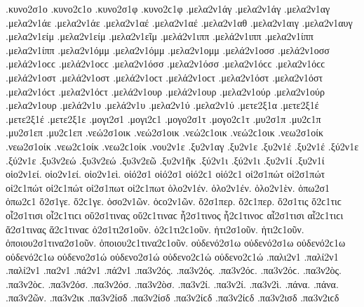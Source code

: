 {.κυνο2σ1ο .κυνο2ϲ1ο
.κυνο2σ1φ .κυνο2ϲ1φ   %
.μελα2ν1άγ .μελα2ν1άγ   %
.μελα2ν1αγ
.μελα2ν1άε .μελα2ν1άε   %
.μελα2ν1αέ .μελα2ν1αέ
.μελα2ν1αθ   %
.μελα2ν1αιγ   %
.μελα2ν1αυγ   %
.μελα2ν1είμ .μελα2ν1είμ   %
.μελα2ν1εῖμ   %
.μελά2ν1ιππ .μελά2ν1ιππ   %
.μελα2ν1ίππ .μελα2ν1ίππ
.μελα2ν1όμμ .μελα2ν1όμμ   %
.μελα2ν1ομμ
.μελά2ν1οσσ .μελά2ν1οσσ .μελά2ν1οϲϲ .μελά2ν1οϲϲ   %
.μελα2ν1όσσ .μελα2ν1όσσ .μελα2ν1όϲϲ .μελα2ν1όϲϲ
.μελά2ν1οστ .μελά2ν1οστ .μελά2ν1οϲτ .μελά2ν1οϲτ   %
.μελα2ν1όστ .μελα2ν1όστ .μελα2ν1όϲτ .μελα2ν1όϲτ
.μελά2ν1ουρ .μελά2ν1ουρ   %
.μελα2ν1ούρ .μελα2ν1ούρ
.μελα2ν1ουρ   %
.μελά2ν1υ .μελά2ν1υ   %
.μελα2ν1ύ .μελα2ν1ύ
.μετε2ξ1α   %
.μετε2ξ1έ .μετε2ξ1έ   %
.μετε2ξ1ε
.μογι2σ1 .μογι2ϲ1   %
.μογο2σ1τ .μογο2ϲ1τ   %
.μυ2σ1π .μυ2ϲ1π   %
.μυ2σ1επ .μυ2ϲ1επ   %
.νεώ2σ1οικ .νεώ2σ1οικ .νεώ2ϲ1οικ .νεώ2ϲ1οικ   %
.νεω2σ1οίκ .νεω2σ1οίκ .νεω2ϲ1οίκ .νεω2ϲ1οίκ
.νου2ν1ε   %
.ξυ2ν1αγ   %
.ξυ2ν1ε
.ξυ2ν1έ .ξυ2ν1έ
.ξύ2ν1ε .ξύ2ν1ε
.ξυ3ν2εώ .ξυ3ν2εώ   %
.ξυ3ν2εῶ
.ξυ2ν1ῆκ   %
.ξύ2ν1ι .ξύ2ν1ι   %
.ξυ2ν1ί .ξυ2ν1ί   %
οἱο2ν1εί. οἱο2ν1εί.   %
οἱο2ν1εὶ.
οἱό2σ1 οἱό2σ1 οἱό2ϲ1 οἱό2ϲ1   %
οἰ2σ1πώτ οἰ2σ1πώτ οἰ2ϲ1πώτ οἰ2ϲ1πώτ   %
οἰ2σ1πωτ οἰ2ϲ1πωτ
ὁλο2ν1έν. ὁλο2ν1έν.
ὁλο2ν1ὲν.
ὁπω2σ1 ὁπω2ϲ1   %
ὅ2σ1γε. ὅ2ϲ1γε.   %
ὁσο2ν1ῶν. ὁϲο2ν1ῶν.   %
ὅ2σ1περ. ὅ2ϲ1περ.   %
ὅ2σ1τις ὅ2ϲ1τιϲ   %
οἷ2σ1τισι οἷ2ϲ1τιϲι   %
οὕ2σ1τινας οὕ2ϲ1τιναϲ   %
ἧ2σ1τινος ἧ2ϲ1τινοϲ   %
αἷ2σ1τισι αἷ2ϲ1τιϲι   %
ἅ2σ1τινας ἅ2ϲ1τιναϲ   %
ὁ2σ1τι2σ1οῦν. ὁ2ϲ1τι2ϲ1οῦν.   %
ἡτι2σ1οῦν. ἡτι2ϲ1οῦν.   %
ὁποιου2σ1τινα2σ1οῦν. ὁποιου2ϲ1τινα2ϲ1οῦν.   %
οὐδενό2σ1ω οὐδενό2σ1ω οὐδενό2ϲ1ω οὐδενό2ϲ1ω   %
οὐδενο2σ1ώ οὐδενο2σ1ώ οὐδενο2ϲ1ώ οὐδενο2ϲ1ώ
.παλι2ν1   %
.παλί2ν1 .παλί2ν1   %
.πα2ν1
.πά2ν1 .πά2ν1
.πα3ν2ός. .πα3ν2ός. .πα3ν2όϲ. .πα3ν2όϲ.   %
.πα3ν2ὸς. .πα3ν2ὸϲ.
.πα3ν2όσ. .πα3ν2όσ.
.πα3ν2ὸσ.
.πα3ν2ί. .πα3ν2ί.
.πα3ν2ὶ.
.πάνα. .πάνα.
.πα3ν2ῶν.
.πα3ν2ικ   %
.πα3ν2ίσδ .πα3ν2ίσδ .πα3ν2ίϲδ .πα3ν2ίϲδ   %
.πα3ν2ισδ .πα3ν2ιϲδ   %
}
